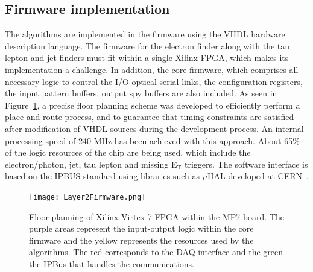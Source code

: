 \documentclass[a4paper,11pt]{article}
\begin{document}
\subsection{Firmware implementation}
The algorithms are implemented in the firmware using the VHDL  hardware description language. The  firmware for the electron finder along with the tau lepton and jet finders must fit within a single Xilinx FPGA, which makes its implementation a challenge. In addition, the core firmware, which comprises all necessary logic to control the I/O optical serial links, the configuration registers, the input pattern buffers, output spy buffers are also included. As seen in Figure~\ref{fig:floorplan}, a precise floor planning scheme was developed to efficiently perform a place and route process, and to guarantee that timing constraints are satisfied after modification of  VHDL sources during the development process. An internal processing speed of 240 MHz has been achieved with this approach. About 65\% of the logic resources of the chip are being used, which include the electron/photon, jet, tau lepton and missing E$_\text{T}$ triggers. The software interface is based on the IPBUS standard using libraries such as $\mu$HAL developed at CERN~\cite{e}.
\begin{figure}[!htbp]
\begin{center}
\begin{minipage}[t]{7cm}
\begin{center}
\vspace{0cm}
\texttt{[image: Layer2Firmware.png]}
\end{center}
\end{minipage}
\hspace{1cm}
\begin{minipage}[t]{6cm}
\begin{center}
\caption{ \label{fig:floorplan}Floor planning of Xilinx Virtex 7 FPGA within the MP7 board. The purple areas represent the input-output logic within the core firmware and the yellow represents the resources used by the algorithms. The red corresponds to the DAQ interface and the green the IPBus that handles the communications. }
\end{center}
\end{minipage}
\end{center}
\end{figure}
\end{document}
